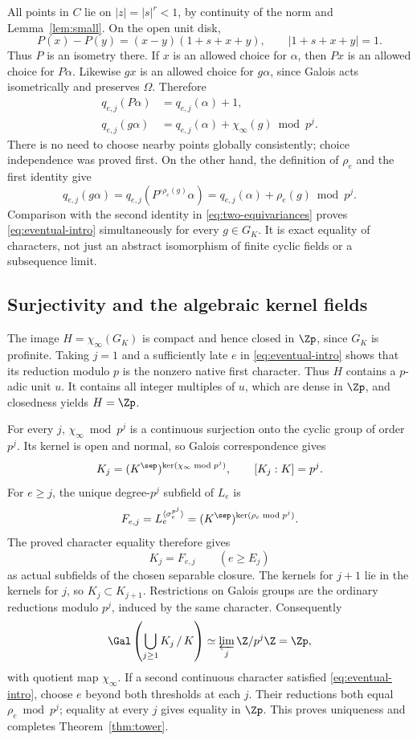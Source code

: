 All points in \(C\) lie on \(|z|=|s|^r<1\), by continuity
of the norm and Lemma~\ref{lem:small}. On the open unit disk,
\[
 P(x)-P(y)=(x-y)(1+s+x+y),\qquad |1+s+x+y|=1.
\]
Thus \(P\) is an isometry there. If \(x\) is an allowed
choice for \(\alpha\), then \(Px\) is an allowed choice for
\(P\alpha\). Likewise \(gx\) is an allowed choice for
\(g\alpha\), since Galois acts isometrically and preserves
\(\Omega\). Therefore
\begin{equation}\label{eq:two-equivariances}
 \begin{aligned}
 q_{e,j}(P\alpha)&=q_{e,j}(\alpha)+1,\\
 q_{e,j}(g\alpha)&=q_{e,j}(\alpha)+\chi_\infty(g)\bmod p^j.
 \end{aligned}
\end{equation}
There is no need to choose nearby points globally consistently;
choice independence was proved first.
On the other hand, the definition of \(\rho_e\) and the
first identity give
\[
 q_{e,j}(g\alpha)
 =q_{e,j}(P^{\circ\rho_e(g)}\alpha)
 =q_{e,j}(\alpha)+\rho_e(g)\bmod p^j.
\]
Comparison with the second identity in
\eqref{eq:two-equivariances} proves
\eqref{eq:eventual-intro} simultaneously for every \(g\in G_K\).
It is exact equality of characters, not just an abstract
isomorphism of finite cyclic fields or a subsequence limit.

\subsection{Surjectivity and the algebraic kernel fields}

The image \(H=\chi_\infty(G_K)\) is compact and hence closed
in \(\Zp\), since \(G_K\) is profinite.
Taking \(j=1\) and a sufficiently late \(e\) in
\eqref{eq:eventual-intro} shows that its reduction modulo
\(p\) is the nonzero native first character.
Thus \(H\) contains a \(p\)-adic unit \(u\).
It contains all integer multiples of \(u\), which are
dense in \(\Zp\), and closedness yields \(H=\Zp\).

For every \(j\), \(\chi_\infty\bmod p^j\) is a continuous
surjection onto the cyclic group of order \(p^j\). Its
kernel is open and normal, so Galois correspondence
\cite[Section 9.22]{stacksgalois} gives
\[
 K_j=(K^\sep)^{\ker(\chi_\infty\bmod p^j)},\qquad
 [K_j:K]=p^j.
\]
For \(e\ge j\), the unique degree-\(p^j\) subfield of
\(L_e\) is
\[
 F_{e,j}=L_e^{\langle\sigma_e^{p^j}\rangle}
 =(K^\sep)^{\ker(\rho_e\bmod p^j)}.
\]
The proved character equality therefore gives
\[
 K_j=F_{e,j}\qquad(e\ge E_j)
\]
as actual subfields of the chosen separable closure.
The kernels for \(j+1\) lie in the kernels for \(j\), so
\(K_j\subset K_{j+1}\).
Restrictions on Galois groups are the ordinary reductions
modulo \(p^j\), induced by the same character. Consequently
\[
 \Gal\left(\bigcup_{j\ge1}K_j\,/\,K\right)
 \simeq\varprojlim_j\Z/p^j\Z=\Zp,
\]
with quotient map \(\chi_\infty\).
If a second continuous character satisfied
\eqref{eq:eventual-intro}, choose \(e\) beyond both thresholds
at each \(j\). Their reductions both equal
\(\rho_e\bmod p^j\); equality at every \(j\) gives equality
in \(\Zp\). This proves uniqueness and completes
Theorem~\ref{thm:tower}.

